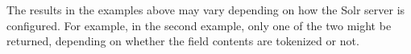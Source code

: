 The results in the examples above may vary depending on how the Solr server is configured. For example, in the second example, only one of the two might be returned, depending on whether the field contents are tokenized or not. 



